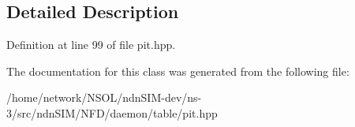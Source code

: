 \subsection{Detailed Description}


Definition at line 99 of file pit.\+hpp.



The documentation for this class was generated from the following file\+:\begin{DoxyCompactItemize}
\item 
/home/network/\+N\+S\+O\+L/ndn\+S\+I\+M-\/dev/ns-\/3/src/ndn\+S\+I\+M/\+N\+F\+D/daemon/table/pit.\+hpp\end{DoxyCompactItemize}
